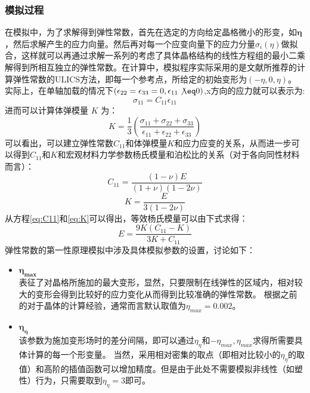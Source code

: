 \subsubsection{模拟过程}
\indent 在模拟中，为了求解得到弹性常数，首先在选定的方向给定晶格微小的形变，如$\mathbf{\eta}$，然后求解产生的应力向量。然后再对每一个应变向量下的应力分量$\sigma_i(\eta)$做拟合，这样就可以再通过求解一系列的考虑了具体晶格结构的线性方程组的最小二乘解得到所相互独立的弹性常数。在计算中，模拟程序实际采用的是文献所推荐的计算弹性常数的ULICS方法\cite{Yu2010Calculations}，即每一个参考点，所给定的初始变形为$(-\eta,0,\eta)$。\\
\indent 实际上，在单轴加载的情况下$(\epsilon_{22}=\epsilon_{33}=0,\epsilon_{11} \not \eq 0)$,x方向的应力就可以表示为:
\begin{equation}
\sigma_{11} = C_{11}\epsilon_{11}
\end{equation}
进而可以计算体弹模量 $K$ 为：
\begin{equation}
K = \frac{1}{3} \left(\frac{\sigma_{11}+\sigma_{22}+\sigma_{33}}{\epsilon_{11}+\epsilon_{22}+\epsilon_{33}} \right)
\end{equation}
可以看出，可以建立弹性常数$C_{11}$和体弹模量$K$和应力应变的关系，从而进一步可以得到$C_{11}$和$K$和宏观材料力学参数杨氏模量和泊松比的关系（对于各向同性材料而言）：
\begin{equation}
\label{eq:C11}
C_{11} =\frac{(1- \nu)E}{(1+\nu)(1-2\nu)}
\end{equation}
\begin{equation}
\label{eq:K}
K = \frac{E}{3(1-2\nu)}
\end{equation}
从方程\ref{eq:C11}和\ref{eq:K}可以得出，等效杨氏模量可以由下式求得：
\begin{equation}
E = \frac{9K(C_{11}-K)}{3K + C_{11}}
\end{equation}
\indent 弹性常数的第一性原理模拟中涉及具体模拟参数的设置，讨论如下：
\begin{itemize}
	\item $\mathbf{\eta_{max}}$ \\
	表征了对晶格所施加的最大变形，显然，只要限制在线弹性的区域内，相对较大的变形会得到比较好的应力变化从而得到比较准确的弹性常数。 根据之前的对于晶体的计算经验，通常而言默认取值为$\eta_{max} = 0.002$。
	\item $\mathbf{\eta_{\eta}}$\\
	该参数为施加变形场时的差分间隔，即可以通过$\eta_{\eta}$和$-\eta_{max},\eta_{max}$求得所需要具体计算的每一个形变量。 当然，采用相对密集的取点（即相对比较小的$\eta_{\eta}$的取值）和高阶的插值函数可以增加精度。但是由于此处不需要模拟非线性（如塑性）行为，只需要取到$\eta_{\eta}=3$即可。
\end{itemize}
